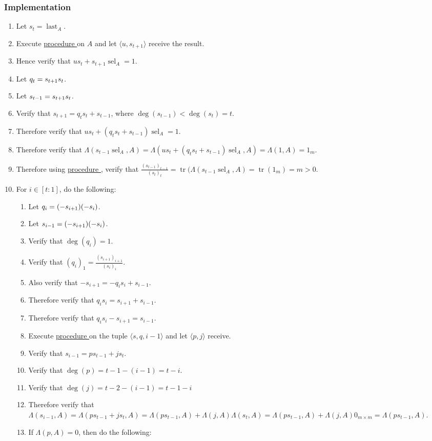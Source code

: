 \documentclass{article}
\DeclareMathOperator{\tr}{tr}
\DeclareMathOperator{\sel}{sel}
\DeclareMathOperator{\last}{last}
\let\div\relax\DeclareMathOperator{\div}{div}
\let\mod\relax\DeclareMathOperator{\mod}{mod}
\newcounter{procedure}[part]
\newcommand{\implementation}{\subsubsection*{Implementation}}
\newcommand{\procedurehr}[1]{\hyperref[sec:procedure #1]{procedure \expandafter\csname procedure#1\endcsname}}
\begin{document}
\begin{multicols}{2}
			\implementation
				\begin{enumerate}
					\item Let $s_t=\last_A$.
					\item Execute \procedurehr{4.63} on $A$ and let $\langle u,s_{t+1}\rangle$ receive the result.
					\item Hence verify that $us_t+s_{t+1}\sel_A=1$.
					\item Let $q_t=s_{t+1}\div s_t$.
					\item Let $s_{t-1}=s_{t+1}\mod s_t$.
					\item Verify that $s_{t+1}=q_ts_t+s_{t-1}$, where $\deg(s_{t-1})<\deg(s_t)=t$.
					\item Therefore verify that $us_t+(q_ts_t+s_{t-1})\sel_A=1$.
					\item Therefore verify that $\Lambda(s_{t-1}\sel_A,A)=\Lambda(us_t+(q_ts_t+s_{t-1})\sel_A,A)=\Lambda(1,A)=1_{m}$.
					\item Therefore using \procedurehr{4.62}, verify that $\frac{(s_{t-1})_{t-1}}{(s_t)_t}=\tr(\Lambda(s_{t-1}\sel_A,A)=\tr(1_{m})=m>0$.
					\item For $i\in[t:1]$, do the following:
					\begin{enumerate}
						\item Let $q_i=(-s_{i+1})\div(-s_i)$.
						\item Let $s_{i-1}=(-s_{i+1})\mod(-s_i)$.
						\item Verify that $\deg(q_i)=1$.
						\item Verify that $(q_i)_1=\frac{(s_{i+1})_{i+1}}{(s_i)_i}$.
						\item Also verify that $-s_{i+1}=-q_is_i+s_{i-1}$.
						\item Therefore verify that $q_is_i=s_{i+1}+s_{i-1}$.
						\item Therefore verify that $q_is_i-s_{i+1}=s_{i-1}$.
						\item Execute \procedurehr{2.26} on the tuple $\langle s,q,i-1\rangle$ and let $\langle p,j\rangle$ receive.
						\item Verify that $s_{i-1}=ps_{t-1}+js_t$.
						\item Verify that $\deg(p)=t-1-(i-1)=t-i$.
						\item Verify that $\deg(j)=t-2-(i-1)=t-1-i$
						\item Therefore verify that $\Lambda(s_{i-1},A)=\Lambda(ps_{t-1}+js_t,A)=\Lambda(ps_{t-1},A)+\Lambda(j,A)\Lambda(s_t,A)=\Lambda(ps_{t-1},A)+\Lambda(j,A)0_{m\times m}=\Lambda(ps_{t-1},A)$.
						\item If $\Lambda(p,A)=0$, then do the following:

\end{enumerate}
\end{enumerate}
\end{multicols}
\end{document}
